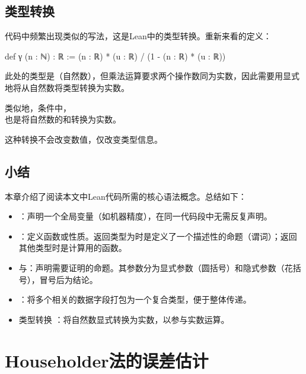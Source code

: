 ﻿\documentclass[UTF8,a4paper,openany]{ctexbook}
\theoremstyle{qrplain}
\begin{document}
\section{类型转换}

代码中频繁出现类似的写法，这是Lean中的类型转换。重新来看的定义：

\begin{leancode}
  def γ (n : ℕ) : ℝ := (n : ℝ) * (u : ℝ) / (1 - (n : ℝ) * (u : ℝ))
\end{leancode}

此处的类型是（自然数），但乘法运算要求两个操作数同为实数，因此需要用显式地将从自然数将类型转换为实数。

类似地，条件中，\\也是将自然数的和转换为实数。

这种转换不会改变数值，仅改变类型信息。

\section{小结}

本章介绍了阅读本文中Lean代码所需的核心语法概念。总结如下：

\begin{itemize}
  \item {}：声明一个全局变量（如机器精度），在同一代码段中无需反复声明。
  \item {}：定义函数或性质。返回类型为时是定义了一个描述性的命题（谓词）；返回其他类型时是计算用的函数。
  \item {}与：声明需要证明的命题。其参数分为显式参数（圆括号）和隐式参数（花括号），冒号后为结论。
  \item {}：将多个相关的数据字段打包为一个复合类型，便于整体传递。
  \item 类型转换 ：将自然数显式转换为实数，以参与实数运算。
\end{itemize}


\chapter{Householder法的误差估计}
\end{document}

